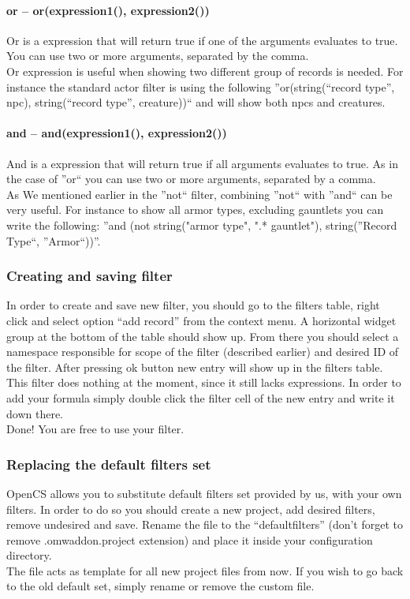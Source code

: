 \paragraph{or -- or(expression1(), expression2())}
Or is a expression that will return true if one of the arguments evaluates to true. You can use two or more arguments, separated by the comma.\\
Or expression is useful when showing two different group of records is needed. For instance the standard actor filter is using the following ''or(string(``record type'', npc), string(``record type'', creature))`` and will show both npcs and creatures.

\paragraph{and -- and(expression1(), expression2())}
And is a expression that will return true if all arguments evaluates to true. As in the case of ''or`` you can use two or more arguments, separated by a comma.\\
As We mentioned earlier in the ''not`` filter, combining ''not`` with ''and`` can be very useful. For instance to show all armor types, excluding gauntlets you can write the following: ''and (not string("armor type", ".* gauntlet"), string(''Record Type``, ''Armor``))''.

\subsubsection{Creating and saving filter}
In order to create and save new filter, you should go to the filters table, right click and select option ``add record'' from the context menu. A horizontal widget group at the bottom of the table should show up. From there you should select a namespace responsible for scope of the filter (described earlier) and desired ID of the filter. After pressing ok button new entry will show up in the filters table. This filter does nothing at the moment, since it still lacks expressions. In order to add your formula simply double click the filter cell of the new entry and write it down there.\\
Done! You are free to use your filter.

\subsubsection{Replacing the default filters set}
{OpenCS} allows you to substitute default filters set provided by us, with your own filters. In order to do so you should create a new project, add desired filters, remove undesired and save. Rename the file to the ``defaultfilters'' (don't forget to remove .omwaddon.project extension) and place it inside your configuration directory.\\
The file acts as template for all new project files from now. If you wish to go back to the old default set, simply rename or remove the custom file.